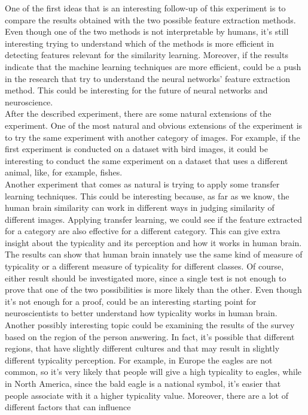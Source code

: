 \documentclass[conference]{IEEEtran}
\begin{document}
			\noindent One of the first ideas that is an interesting follow-up of this experiment is to compare the results obtained with the two possible feature extraction methods. Even though one of the two methods is not 
			interpretable by humans, it's still interesting trying to understand which of the methods is more efficient in detecting features relevant for the similarity learning. Moreover, if the results 
			indicate that the machine learning techniques are more efficient, could be a push in the research that try to understand the neural networks' feature extraction method. This could be interesting 
			for the future of neural networks and neuroscience. \\
			After the described experiment, there are some natural extensions of the experiment. One of the most natural and obvious extensions of the experiment is to try the same experiment with another category 
			of images. For example, if the first experiment is conducted on a dataset with bird images, it could be interesting to conduct the same experiment on a dataset that uses a different animal, like, for 
			example, fishes.\\
			Another experiment that comes as natural is trying to apply some transfer learning techniques. This could be interesting because, as far as we know, the human brain similarity can work 
			in different ways in judging similarity of different images. Applying transfer learning, we could see if the feature extracted for a category are also effective for a different category. This can give 
			extra insight about the typicality and its perception and how it works in human brain. The results can show that human brain innately use the same kind of measure of typicality or a different measure of 
			typicality for different classes. Of course, either result should be investigated more, since a single test is not enough to prove that one of the two possibilities is more likely than the other. Even though 
			it's not enough for a proof, could be an interesting starting point for neuroscientists to better understand how typicality works in human brain.\\
			Another possibly interesting topic could be examining the results of the survey based on the region of the person answering. In fact, it's possible that different regions, that have slightly different 
			cultures and that may result in slightly different typicality perception. For example, in Europe the eagles are not common, so it's very likely that people will give a high typicality to eagles, while 
			in North America, since the bald eagle is a national symbol, it's easier that people associate with it a higher typicality value. Moreover, there are a lot of different factors that can influence 
\end{document}
